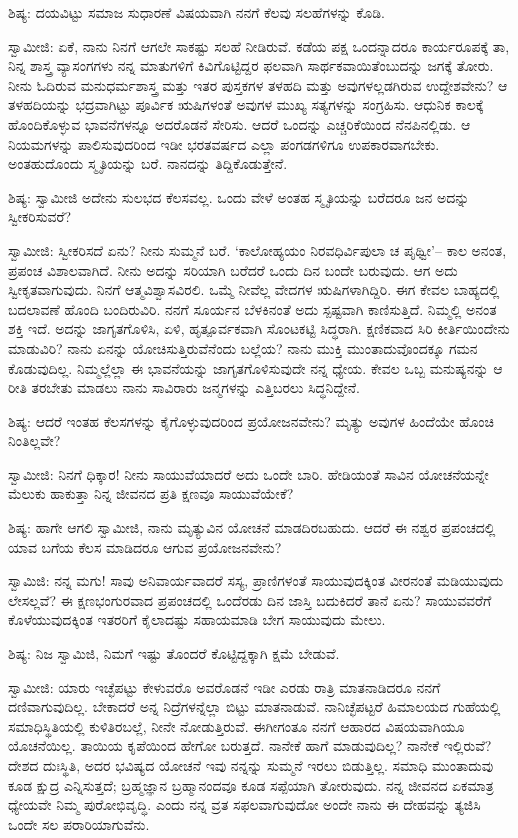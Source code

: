 ಶಿಷ್ಯ: ದಯವಿಟ್ಟು ಸಮಾಜ ಸುಧಾರಣೆ ವಿಷಯವಾಗಿ ನನಗೆ ಕೆಲವು ಸಲಹೆಗಳನ್ನು ಕೊಡಿ.

ಸ್ವಾಮೀಜಿ: ಏಕೆ, ನಾನು ನಿನಗೆ ಆಗಲೇ ಸಾಕಷ್ಟು ಸಲಹೆ ನೀಡಿರುವೆ. ಕಡೆಯ ಪಕ್ಷ ಒಂದನ್ನಾದರೂ ಕಾರ್ಯರೂಪಕ್ಕೆ ತಾ, ನಿನ್ನ ಶಾಸ್ತ್ರ ವ್ಯಾಸಂಗಗಳು ನನ್ನ ಮಾತುಗಳಿಗೆ ಕಿವಿಗೊಟ್ಟಿದ್ದರ ಫಲವಾಗಿ ಸಾರ್ಥಕವಾಯಿತೆಂಬುದನ್ನು ಜಗಕ್ಕೆ ತೋರು. ನೀನು ಓದಿರುವ ಮನುಧರ್ಮಶಾಸ್ತ್ರ ಮತ್ತು ಇತರ ಪುಸ್ತಕಗಳ ತಳಹದಿ ಮತ್ತು ಅವುಗಳಲ್ಲಡಗಿರುವ ಉದ್ದೇಶವೇನು? ಆ ತಳಹದಿಯನ್ನು ಭದ್ರವಾಗಿಟ್ಟು ಪೂರ್ವಿಕ ಋಷಿಗಳಂತೆ ಅವುಗಳ ಮುಖ್ಯ ಸತ್ಯಗಳನ್ನು ಸಂಗ್ರಹಿಸು. ಆಧುನಿಕ ಕಾಲಕ್ಕೆ ಹೊಂದಿಕೊಳ್ಳುವ ಭಾವನೆಗಳನ್ನೂ ಅದರೊಡನೆ ಸೇರಿಸು. ಆದರೆ ಒಂದನ್ನು ಎಚ್ಚರಿಕೆಯಿಂದ ನೆನಪಿನಲ್ಲಿಡು. ಆ ನಿಯಮಗಳನ್ನು ಪಾಲಿಸುವುದರಿಂದ ಇಡೀ ಭರತವರ್ಷದ ಎಲ್ಲಾ ಪಂಗಡಗಳಿಗೂ ಉಪಕಾರವಾಗಬೇಕು. ಅಂತಹುದೊಂದು ಸ್ಮೃತಿಯನ್ನು ಬರೆ. ನಾನದನ್ನು ತಿದ್ದಿಕೊಡುತ್ತೇನೆ.

ಶಿಷ್ಯ: ಸ್ವಾಮೀಜಿ ಅದೇನು ಸುಲಭದ ಕೆಲಸವಲ್ಲ. ಒಂದು ವೇಳೆ ಅಂತಹ ಸ್ಮೃತಿಯನ್ನು ಬರೆದರೂ ಜನ ಅದನ್ನು ಸ್ವೀಕರಿಸುವರೆ?

ಸ್ವಾಮೀಜಿ: ಸ್ವೀಕರಿಸದೆ ಏನು? ನೀನು ಸುಮ್ಮನೆ ಬರೆ. ‘ಕಾಲೋಹ್ಯಯಂ ನಿರವಧಿರ್ವಿಪುಲಾ ಚ ಪೃಥ್ವೀ’– ಕಾಲ ಅನಂತ, ಪ್ರಪಂಚ ವಿಶಾಲವಾಗಿದೆ. ನೀನು ಅದನ್ನು ಸರಿಯಾಗಿ ಬರೆದರೆ ಒಂದು ದಿನ ಬಂದೇ ಬರುವುದು. ಆಗ ಅದು ಸ್ವೀಕೃತವಾಗುವುದು. ನಿನಗೆ ಆತ್ಮವಿಶ್ವಾಸವಿರಲಿ. ಒಮ್ಮೆ ನೀವೆಲ್ಲ ವೇದಗಳ ಋಷಿಗಳಾಗಿದ್ದಿರಿ. ಈಗ ಕೇವಲ ಬಾಹ್ಯದಲ್ಲಿ ಬದಲಾವಣೆ ಹೊಂದಿ ಬಂದಿರುವಿರಿ. ನನಗೆ ಸೂರ್ಯನ ಬೆಳಕಿನಂತೆ ಅದು ಸ್ಪಷ್ಟವಾಗಿ ಕಾಣಿಸುತ್ತಿದೆ. ನಿಮ್ಮಲ್ಲಿ ಅನಂತ ಶಕ್ತಿ ಇದೆ. ಅದನ್ನು ಜಾಗೃತಗೊಳಿಸಿ, ಏಳಿ, ಹೃತ್ಪೂರ್ವಕವಾಗಿ ಸೊಂಟಕಟ್ಟಿ ಸಿದ್ಧರಾಗಿ. ಕ್ಷಣಿಕವಾದ ಸಿರಿ ಕೀರ್ತಿಯಿಂದೇನು ಮಾಡುವಿರಿ? ನಾನು ಏನನ್ನು ಯೋಚಿಸುತ್ತಿರುವೆನೆಂದು ಬಲ್ಲೆಯ? ನಾನು ಮುಕ್ತಿ ಮುಂತಾದುವೊಂದಕ್ಕೂ ಗಮನ ಕೊಡುವುದಿಲ್ಲ. ನಿಮ್ಮಲ್ಲೆಲ್ಲಾ ಈ ಭಾವನೆಯನ್ನು ಜಾಗೃತಗೊಳಿಸುವುದೇ ನನ್ನ ಧ್ಯೇಯ. ಕೇವಲ ಒಬ್ಬ ಮನುಷ್ಯನನ್ನು ಆ ರೀತಿ ತರಬೇತು ಮಾಡಲು ನಾನು ಸಾವಿರಾರು ಜನ್ಮಗಳನ್ನು ಎತ್ತಿಬರಲು ಸಿದ್ಧನಿದ್ದೇನೆ.

ಶಿಷ್ಯ: ಆದರೆ ಇಂತಹ ಕೆಲಸಗಳನ್ನು ಕೈಗೊಳ್ಳುವುದರಿಂದ ಪ್ರಯೋಜನವೇನು? ಮೃತ್ಯು ಅವುಗಳ ಹಿಂದೆಯೇ ಹೊಂಚಿ ನಿಂತಿಲ್ಲವೇ?

ಸ್ವಾಮೀಜಿ: ನಿನಗೆ ಧಿಕ್ಕಾರ! ನೀನು ಸಾಯುವೆಯಾದರೆ ಅದು ಒಂದೇ ಬಾರಿ. ಹೇಡಿಯಂತೆ ಸಾವಿನ ಯೋಚನೆಯನ್ನೇ ಮೆಲುಕು ಹಾಕುತ್ತಾ ನಿನ್ನ ಜೀವನದ ಪ್ರತಿ ಕ್ಷಣವೂ ಸಾಯುವೆಯೇಕೆ?

ಶಿಷ್ಯ: ಹಾಗೇ ಆಗಲಿ ಸ್ವಾಮೀಜಿ, ನಾನು ಮೃತ್ಯುವಿನ ಯೋಚನೆ ಮಾಡದಿರಬಹುದು. ಆದರೆ ಈ ನಶ್ವರ ಪ್ರಪಂಚದಲ್ಲಿ ಯಾವ ಬಗೆಯ ಕೆಲಸ ಮಾಡಿದರೂ ಆಗುವ ಪ್ರಯೋಜನವೇನು?

ಸ್ವಾಮಿಜಿ: ನನ್ನ ಮಗು! ಸಾವು ಅನಿವಾರ್ಯವಾದರೆ ಸಸ್ಯ, ಪ್ರಾಣಿಗಳಂತೆ ಸಾಯುವುದಕ್ಕಿಂತ ವೀರನಂತೆ ಮಡಿಯುವುದು ಲೇಸಲ್ಲವೆ? ಈ ಕ್ಷಣಭಂಗುರವಾದ ಪ್ರಪಂಚದಲ್ಲಿ ಒಂದೆರಡು ದಿನ ಜಾಸ್ತಿ ಬದುಕಿದರೆ ತಾನೆ ಏನು? ಸಾಯುವವರೆಗೆ ಕೊಳೆಯುವುದಕ್ಕಿಂತ ಇತರರಿಗೆ ಕೈಲಾದಷ್ಟು ಸಹಾಯಮಾಡಿ ಬೇಗ ಸಾಯುವುದು ಮೇಲು.

ಶಿಷ್ಯ: ನಿಜ ಸ್ವಾಮಿಜಿ, ನಿಮಗೆ ಇಷ್ಟು ತೊಂದರೆ ಕೊಟ್ಟಿದ್ದಕ್ಕಾಗಿ ಕ್ಷಮೆ ಬೇಡುವೆ.

ಸ್ವಾಮೀಜಿ: ಯಾರು ಇಚ್ಛೆಪಟ್ಟು ಕೇಳುವರೊ ಅವರೊಡನೆ ಇಡೀ ಎರಡು ರಾತ್ರಿ ಮಾತನಾಡಿದರೂ ನನಗೆ ದಣಿವಾಗುವುದಿಲ್ಲ. ಬೇಕಾದರೆ ಅನ್ನ ನಿದ್ರೆಗಳನ್ನೆಲ್ಲಾ ಬಿಟ್ಟು ಮಾತನಾಡುವೆ. ನಾನಿಚ್ಛೆಪಟ್ಟರೆ ಹಿಮಾಲಯದ ಗುಹೆಯಲ್ಲಿ ಸಮಾಧಿಸ್ಥಿತಿಯಲ್ಲಿ ಕುಳಿತಿರಬಲ್ಲೆ, ನೀನೇ ನೋಡುತ್ತಿರುವೆ. ಈಗೀಗಂತೂ ನನಗೆ ಆಹಾರದ ವಿಷಯವಾಗಿಯೂ ಯೊಚನೆಯಿಲ್ಲ. ತಾಯಿಯ ಕೃಪೆಯಿಂದ ಹೇಗೋ ಬರುತ್ತದೆ. ನಾನೇಕೆ ಹಾಗೆ ಮಾಡುವುದಿಲ್ಲ? ನಾನೇಕೆ ಇಲ್ಲಿರುವೆ? ದೇಶದ ದುಃಸ್ಥಿತಿ, ಅದರ ಭವಿಷ್ಯದ ಯೋಚನೆ ಇವು ನನ್ನನ್ನು ಸುಮ್ಮನೆ ಇರಲು ಬಿಡುತ್ತಿಲ್ಲ. ಸಮಾಧಿ ಮುಂತಾದುವು ಕೂಡ ಕ್ಷುದ್ರ ಎನ್ನಿಸುತ್ತದೆ; ಬ್ರಹ್ಮಜ್ಞಾನ ಬ್ರಹ್ಮಾನಂದವೂ ಕೂಡ ಸಪ್ಪೆಯಾಗಿ ತೋರುವುದು. ನನ್ನ ಜೀವನದ ಏಕಮಾತ್ರ ಧ್ಯೇಯವೇ ನಿಮ್ಮ ಪುರೋಭಿವೃದ್ಧಿ. ಎಂದು ನನ್ನ ವ್ರತ ಸಫಲವಾಗುವುದೋ ಅಂದೇ ನಾನು ಈ ದೇಹವನ್ನು ತ್ಯಜಿಸಿ ಒಂದೇ ಸಲ ಪರಾರಿಯಾಗುವೆನು.

